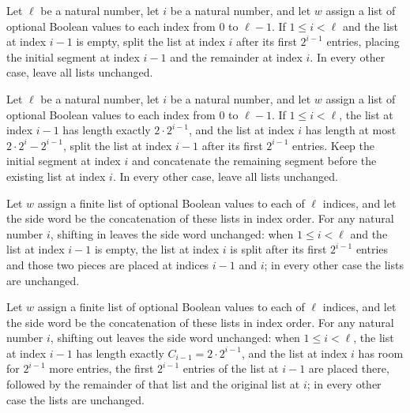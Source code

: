 \begin{definition}
\label{Turing.zoneShiftInW}
\leanok
Let $\ell$ be a natural number, let $i$ be a natural number, and let $w$ assign a list
of optional Boolean values to each index from $0$ to $\ell-1$. If $1\le i<\ell$ and the
list at index $i-1$ is empty, split the list at index $i$ after its first $2^{i-1}$
entries, placing the initial segment at index $i-1$ and the remainder at index $i$. In
every other case, leave all lists unchanged.
\end{definition}

\begin{definition}
\label{Turing.zoneShiftOutW}
\leanok
{}
Let $\ell$ be a natural number, let $i$ be a natural number, and let $w$ assign a list
of optional Boolean values to each index from $0$ to $\ell-1$. If $1\le i<\ell$, the
list at index $i-1$ has length exactly $2\cdot 2^{i-1}$, and the list at index $i$ has
length at most $2\cdot 2^i-2^{i-1}$, split the list at index $i-1$ after its first
$2^{i-1}$ entries. Keep the initial segment at index $i$ and concatenate the remaining
segment before the existing list at index $i$. In every other case, leave all lists
unchanged.
\end{definition}

\begin{theorem}
\label{Turing.zoneSide_shiftInW}
\leanok
{}
Let $w$ assign a finite list of optional Boolean values to each of $\ell$ indices, and
let the side word be the concatenation of these lists in index order. For any natural
number $i$, shifting in leaves the side word unchanged: when $1\le i<\ell$ and the list
at index $i-1$ is empty, the list at index $i$ is split after its first $2^{i-1}$
entries and those two pieces are placed at indices $i-1$ and $i$; in every other case
the lists are unchanged.
\end{theorem}

\begin{theorem}
\label{Turing.zoneSide_shiftOutW}
\leanok
{}
Let $w$ assign a finite list of optional Boolean values to each of $\ell$ indices, and
let the side word be the concatenation of these lists in index order. For any natural
number $i$, shifting out leaves the side word unchanged: when $1\le i<\ell$, the list at
index $i-1$ has length exactly $C_{i-1}=2\cdot 2^{i-1}$, and the list at index $i$ has
room for $2^{i-1}$ more entries, the first $2^{i-1}$ entries of the list at $i-1$ are
placed there, followed by the remainder of that list and the original list at $i$; in
every other case the lists are unchanged.
\end{theorem}

